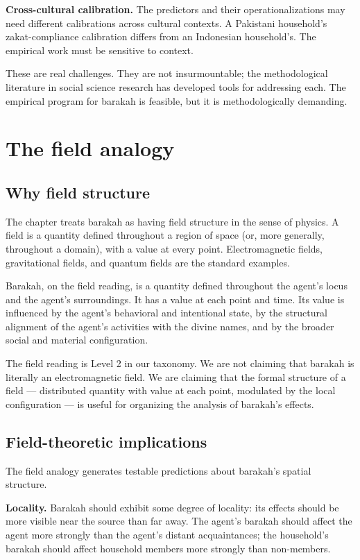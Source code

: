 \textbf{Cross-cultural calibration.} The predictors and their
operationalizations may need different calibrations across
cultural contexts. A Pakistani household's zakat-compliance
calibration differs from an Indonesian household's. The empirical
work must be sensitive to context.

These are real challenges. They are not insurmountable; the
methodological literature in social science research has
developed tools for addressing each. The empirical program for
barakah is feasible, but it is methodologically demanding.

\section{The field analogy}
\label{sec:bar-field-analogy}

\subsection{Why field structure}

The chapter treats barakah as having field structure in the sense
of physics. A field is a quantity defined throughout a region of
space (or, more generally, throughout a domain), with a value at
every point. Electromagnetic fields, gravitational fields, and
quantum fields are the standard examples.

Barakah, on the field reading, is a quantity defined throughout
the agent's locus and the agent's surroundings. It has a value at
each point and time. Its value is influenced by the agent's
behavioral and intentional state, by the structural alignment of
the agent's activities with the divine names, and by the broader
social and material configuration.

The field reading is Level 2 in our taxonomy. We are not claiming
that barakah is literally an electromagnetic field. We are
claiming that the formal structure of a field --- distributed
quantity with value at each point, modulated by the local
configuration --- is useful for organizing the analysis of
barakah's effects.

\subsection{Field-theoretic implications}

The field analogy generates testable predictions about barakah's
spatial structure.

\textbf{Locality.} Barakah should exhibit some degree of locality:
its effects should be more visible near the source than far away.
The agent's barakah should affect the agent more strongly than the
agent's distant acquaintances; the household's barakah should
affect household members more strongly than non-members.


